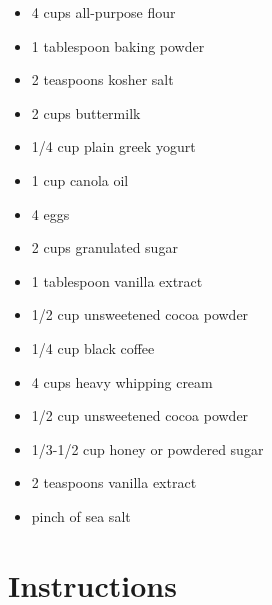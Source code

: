 \documentclass[
  letterpaper,
  DIV=11,
  numbers=noendperiod,
  titlepage=false]{scrreprt}
\providecommand{\tightlist}{%
  \setlength{\itemsep}{0pt}\setlength{\parskip}{0pt}}\usepackage{longtable,booktabs,array}
\begin{document}
\begin{itemize}
\tightlist
\item
  4 cups all-purpose flour
\item
  1 tablespoon baking powder
\item
  2 teaspoons kosher salt
\item
  2 cups buttermilk
\item
  1/4 cup plain greek yogurt
\item
  1 cup canola oil
\item
  4 eggs
\item
  2 cups granulated sugar
\item
  1 tablespoon vanilla extract
\item
  1/2 cup unsweetened cocoa powder
\item
  1/4 cup black coffee
\item
  4 cups heavy whipping cream
\item
  1/2 cup unsweetened cocoa powder
\item
  1/3-1/2 cup honey or powdered sugar
\item
  2 teaspoons vanilla extract
\item
  pinch of sea salt
\end{itemize}

\section{Instructions}\label{instructions-106}
\end{document}
